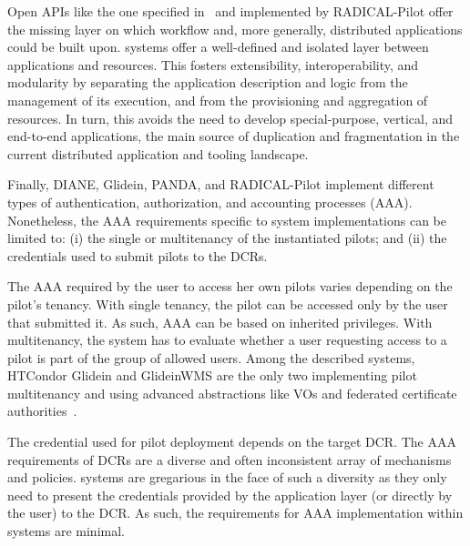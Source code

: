 \documentclass{sig-alternate}
\begin{document}
Open APIs like the one specified in~\cite{luckow2012towards} and implemented by
RADICAL-Pilot offer the missing layer on which workflow and, more generally,
distributed applications could be built upon. %
\pilot systems offer a well-defined and isolated layer between
applications and resources. This fosters extensibility, interoperability, and
modularity by separating the application description and logic from the
management of its execution, and from the provisioning and aggregation of
resources. In turn, this avoids the need to develop special-purpose, vertical,
and end-to-end applications, the main source of duplication and fragmentation in
the current distributed application and tooling landscape. 




Finally, DIANE, Glidein, PANDA, and RADICAL-Pilot implement
different types of authentication, authorization, and accounting processes
(AAA). Nonetheless, the AAA requirements specific to \pilot system
implementations can be limited to: (i) the single or multitenancy of the
instantiated pilots; and (ii) the credentials used to submit pilots to the DCRs.

The AAA required by the user to access her own pilots varies depending on the
pilot's tenancy. With single tenancy, the pilot can be accessed only by the user
that submitted it. As such, AAA can be based on inherited privileges. With
multitenancy, the \pilot system has to evaluate whether a user requesting access
to a pilot is part of the group of allowed users. Among the described \pilot
systems, HTCondor Glidein and GlideinWMS are the only two implementing pilot
multitenancy and using advanced abstractions like VOs and federated certificate
authorities~\cite{horwitz2002}.

The credential used for pilot deployment depends on the target DCR. The AAA
requirements of DCRs are a diverse and often inconsistent array of mechanisms
and policies. \pilot systems are gregarious in the face of such a diversity as
they only need to present the credentials provided by the application layer (or
directly by the user) to the DCR. As such, the requirements for AAA
implementation within \pilot systems are minimal.
\end{document}
